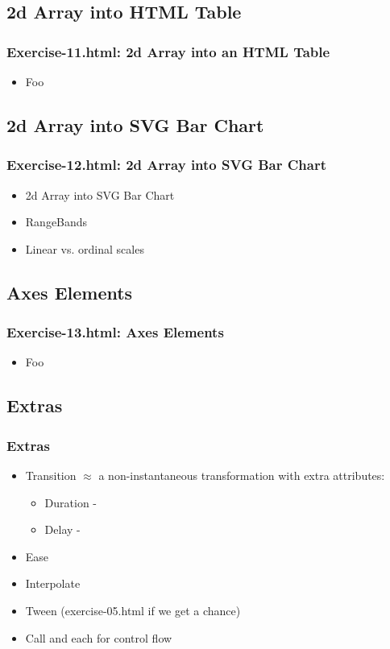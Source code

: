 \documentclass{beamer}
\begin{document}
\subsection{2d Array into HTML Table}

\begin{frame}
    \frametitle{Exercise-11.html: 2d Array into an HTML Table}
    \begin{itemize}
    \item Foo
    \end{itemize}
\end{frame}



\subsection{2d Array into SVG Bar Chart}

\begin{frame}
    \frametitle{Exercise-12.html: 2d Array into SVG Bar Chart}
    \begin{itemize}
    \item 2d Array into SVG Bar Chart
    \item RangeBands
    \item Linear vs. ordinal scales
    \end{itemize}
\end{frame}



\subsection{Axes Elements}

\begin{frame}
    \frametitle{Exercise-13.html: Axes Elements}
    \begin{itemize}
    \item Foo
    \end{itemize} 
\end{frame}



\subsection{Extras}

\begin{frame}
    \frametitle{Extras}
    \begin{itemize}
    \item Transition $\approx$ a non-instantaneous transformation with extra attributes:
        \begin{itemize}
        \item Duration - 
        \item Delay -  
        \end{itemize}
    \item Ease
    \item Interpolate
    \item Tween (exercise-05.html if we get a chance)
    \item Call and each for control flow 
    \end{itemize}
\end{frame}
\end{document}

